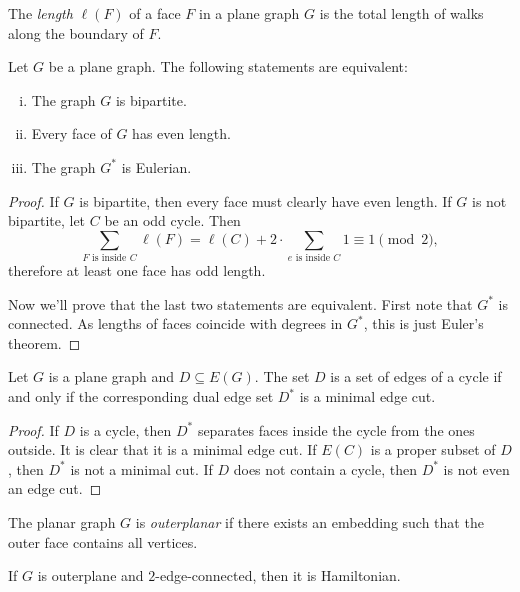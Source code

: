 \begin{definicija}
The \emph{length} $\ell(F)$ of a face $F$ in a plane
graph $G$ is the total length of walks along the boundary of $F$.
\end{definicija}

\begin{izrek}
Let $G$ be a plane graph. The following statements are equivalent:

\begin{enumerate}[i)]
\item The graph $G$ is bipartite.
\item Every face of $G$ has even length.
\item The graph $G^*$ is Eulerian.
\end{enumerate}
\end{izrek}

\begin{proof}
If $G$ is bipartite, then every face must clearly have even length.
If $G$ is not bipartite, let $C$ be an odd cycle. Then
\[
\sum_{\text{$F$ is inside $C$}} \ell(F) =
\ell(C) + 2 \cdot \sum_{\text{$e$ is inside $C$}} 1 \equiv
1 \pmod{2},
\]
therefore at least one face has odd length.

Now we'll prove that the last two statements are equivalent. First
note that $G^*$ is connected. As lengths of faces coincide with
degrees in $G^*$, this is just Euler's theorem.
\end{proof}

\begin{izrek}
Let $G$ is a plane graph and $D \subseteq E(G)$. The set $D$ is a
set of edges of a cycle if and only if the corresponding dual edge
set $D^*$ is a minimal edge cut.
\end{izrek}

\begin{proof}
If $D$ is a cycle, then $D^*$ separates faces inside the cycle from
the ones outside. It is clear that it is a minimal edge cut. If
$E(C)$ is a proper subset of $D$, then $D^*$ is not a minimal cut.
If $D$ does not contain a cycle, then $D^*$ is not even an edge
cut.
\end{proof}

\begin{definicija}
The planar graph $G$ is \emph{outerplanar}
if there exists an embedding such that the outer face contains all
vertices.
\end{definicija}

\begin{opomba}
If $G$ is outerplane and $2$-edge-connected, then it is
Hamiltonian.
\end{opomba}


